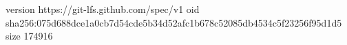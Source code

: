 version https://git-lfs.github.com/spec/v1
oid sha256:075d688dce1a0cb7d54cde5b34d52afc1b678c52085db4534c5f23256f95d1d5
size 174916
